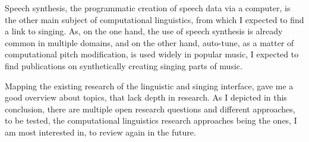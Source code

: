 Speech synthesis, the programmatic creation of speech data via a computer, is the other main subject of computational linguistics, from which I expected to find a link to singing. As, on the one hand, the use of speech synthesis is already common in multiple domains, and on the other hand, auto-tune, as a matter of computational pitch modification, is used widely in popular music, I expected to find publications on synthetically creating singing parts of music.







Mapping the existing research of the linguistic and singing interface, gave me a good overview about topics, that lack depth in research. As I depicted in this conclusion, there are multiple open research questions and different approaches, to be tested, the computational linguistics research approaches being the ones, I am most interested in, to review again in the future.
